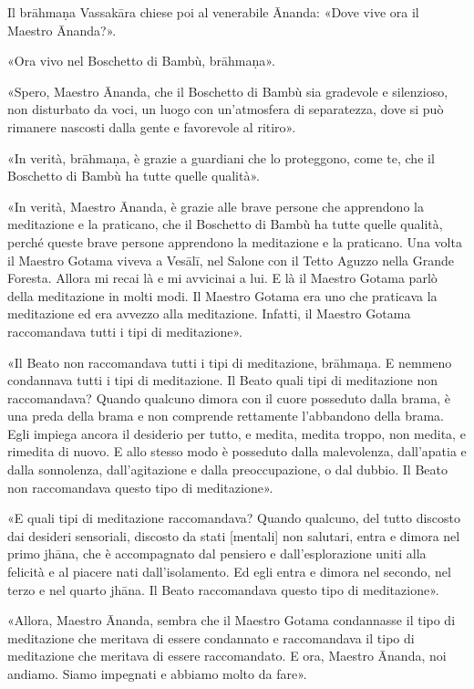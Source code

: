 Il brāhmaṇa Vassakāra chiese poi al venerabile Ānanda: «Dove vive ora il Maestro
Ānanda?».

«Ora vivo nel Boschetto di Bambù, brāhmaṇa».

«Spero, Maestro Ānanda, che il Boschetto di Bambù sia gradevole e silenzioso,
non disturbato da voci, un luogo con un’atmosfera di separatezza, dove si può
rimanere nascosti dalla gente e favorevole al ritiro».

«In verità, brāhmaṇa, è grazie a guardiani che lo proteggono, come te, che il
Boschetto di Bambù ha tutte quelle qualità».

«In verità, Maestro Ānanda, è grazie alle brave persone che apprendono la
meditazione e la praticano, che il Boschetto di Bambù ha tutte quelle qualità,
perché queste brave persone apprendono la meditazione e la praticano. Una volta
il Maestro Gotama viveva a Vesālī, nel Salone con il Tetto Aguzzo nella Grande
Foresta. Allora mi recai là e mi avvicinai a lui. E là il Maestro Gotama parlò
della meditazione in molti modi. Il Maestro Gotama era uno che praticava la
meditazione ed era avvezzo alla meditazione. Infatti, il Maestro Gotama
raccomandava tutti i tipi di meditazione».

«Il Beato non raccomandava tutti i tipi di meditazione, brāhmaṇa. E nemmeno
condannava tutti i tipi di meditazione. Il Beato quali tipi di meditazione non
raccomandava? Quando qualcuno dimora con il cuore posseduto dalla brama, è una
preda della brama e non comprende rettamente l’abbandono della brama. Egli
impiega ancora il desiderio per tutto, e medita, medita troppo, non medita, e
rimedita di nuovo. E allo stesso modo è posseduto dalla malevolenza, dall’apatia
e dalla sonnolenza, dall’agitazione e dalla preoccupazione, o dal dubbio. Il
Beato non raccomandava questo tipo di meditazione».

«E quali tipi di meditazione raccomandava? Quando qualcuno, del tutto discosto
dai desideri sensoriali, discosto da stati [mentali] non salutari, entra e
dimora nel primo jhāna, che è accompagnato dal pensiero e dall’esplorazione
uniti alla felicità e al piacere nati dall’isolamento. Ed egli entra e dimora
nel secondo, nel terzo e nel quarto jhāna. Il Beato raccomandava questo tipo di
meditazione».

«Allora, Maestro Ānanda, sembra che il Maestro Gotama condannasse il tipo di
meditazione che meritava di essere condannato e raccomandava il tipo di
meditazione che meritava di essere raccomandato. E ora, Maestro Ānanda, noi
andiamo. Siamo impegnati e abbiamo molto da fare».

